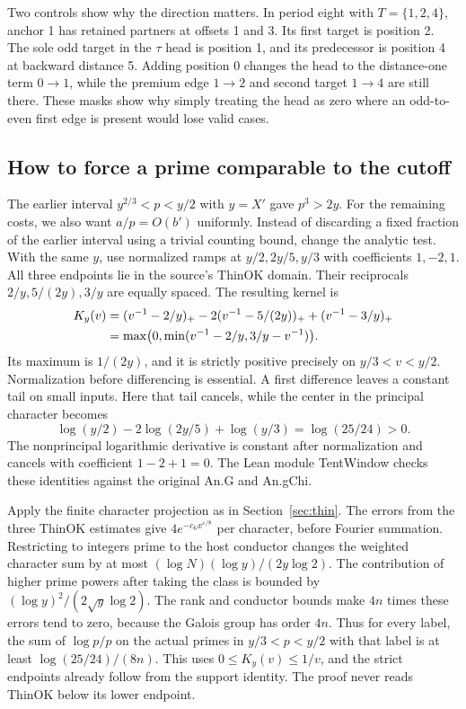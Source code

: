 \documentclass[12pt,letterpaper]{article}
\DeclareRobustCommand{\id}[1]{\mbox{\small\ttfamily #1}}
\begin{document}
Two controls show why the direction matters. In period eight with \(T=\{1,2,4\}\), anchor 1 has retained partners at offsets 1 and 3. Its first target is position 2. The sole odd target in the \(\tau\) head is position 1, and its predecessor is position 4 at backward distance 5. Adding position 0 changes the head to the distance-one term \(0\longrightarrow1\), while the premium edge \(1\longrightarrow2\) and second target \(1\longrightarrow4\) are still there. These masks show why simply treating the head as zero where an odd-to-even first edge is present would lose valid cases.

\subsection{How to force a prime comparable to the cutoff}

The earlier interval \(y^{2/3}<p<y/2\) with \(y=X'\) gave \(p^3>2y\). For the remaining costs, we also want \(a/p=O(b')\) uniformly. Instead of discarding a fixed fraction of the earlier interval using a trivial counting bound, change the analytic test. With the same \(y\), use normalized ramps at \(y/2,2y/5,y/3\) with coefficients \(1,-2,1\). All three endpoints lie in the source's \id{ThinOK} domain. Their reciprocals \(2/y,5/(2y),3/y\) are equally spaced. The resulting kernel is
\begin{align}
 K_y(v)&=(v^{-1}-2/y)_+-2(v^{-1}-5/(2y))_+ +(v^{-1}-3/y)_+ \notag\\
       &=\max\bigl(0,\min(v^{-1}-2/y,3/y-v^{-1})\bigr).
       \label{eq:window-tent}
\end{align}
Its maximum is \(1/(2y)\), and it is strictly positive precisely on \(y/3<v<y/2\). Normalization before differencing is essential. A first difference leaves a constant tail on small inputs. Here that tail cancels, while the center in the principal character becomes
\[
                  \log(y/2)-2\log(2y/5)+\log(y/3)=\log(25/24)>0.
\]
The nonprincipal logarithmic derivative is constant after normalization and cancels with coefficient \(1-2+1=0\). The Lean module \id{TentWindow} checks these identities against the original \id{An.G} and \id{An.gChi}.

Apply the finite character projection as in Section~\ref{sec:thin}. The errors from the three \id{ThinOK} estimates give \(4e^{-c_6 x^{\varepsilon/8}}\) per character, before Fourier summation. Restricting to integers prime to the host conductor changes the weighted character sum by at most \((\log N)(\log y)/(2y\log 2)\). The contribution of higher prime powers after taking the class is bounded by \((\log y)^2/(2\sqrt{y}\log2)\). The rank and conductor bounds make \(4n\) times these errors tend to zero, because the Galois group has order \(4n\). Thus for every label, the sum of \(\log p/p\) on the actual primes in \(y/3<p<y/2\) with that label is at least \(\log(25/24)/(8n)\). This uses \(0\le K_y(v)\le1/v\), and the strict endpoints already follow from the support identity. The proof never reads \id{ThinOK} below its lower endpoint.
\end{document}

